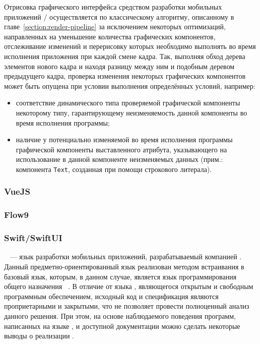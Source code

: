 Отрисовка графического интерфейса средством разработки мобильных
приложений / осуществляется по классическому
алгоритму, описанному в главе~\ref{section:render-pipeline} за исключением
некоторых оптимизаций, направленных на уменьшение количества графических
компонентов, отслеживание изменений и перерисовку которых необходимо
выполнять во время исполнения приложения при каждой смене кадра. Так,
выполняя обход дерева элементов нового кадра и находя разницу между ним
и подобным деревом предыдущего кадра, проверка изменения некоторых
графических компонентов может быть опущена при условии выполнения
определённых условий, например:
\begin{itemize}
	\item соответствие динамического типа проверяемой графической компоненты
	некоторому типу, гарантирующему неизменяемость данной компоненты
	во время исполнения программы;
	\item наличие у потенциально изменяемой во время исполнения программы
	графической компоненты выставленного атрибута, указывающего
	на использование в данной компоненте неизменяемых данных (прим.:
	компонента \texttt{Text}, созданная при помощи строкового литерала).
\end{itemize}

\subsubsection*{VueJS}

\subsubsection*{Flow9}

\subsubsection*{Swift/SwiftUI}
~\cite{swiftui-homepage} --- язык разработки мобильных
приложений, разрабатываемый компанией . Данный
предметно-ориентированный язык реализован методом встраивания в базовый
язык, которым, в данном случае, является язык программирования общего
назначения ~\cite{swift-homepage}. В отличие от языка
, являющегося открытым и свободным программным обеспечением,
исходный код и спецификация  являются проприетарными и
закрытыми, что не позволяет провести полноценный анализ данного решения.
При этом, на основе наблюдаемого поведения программ, написанных на языке
, и доступной документации можно сделать некоторые выводы о
реализации .

